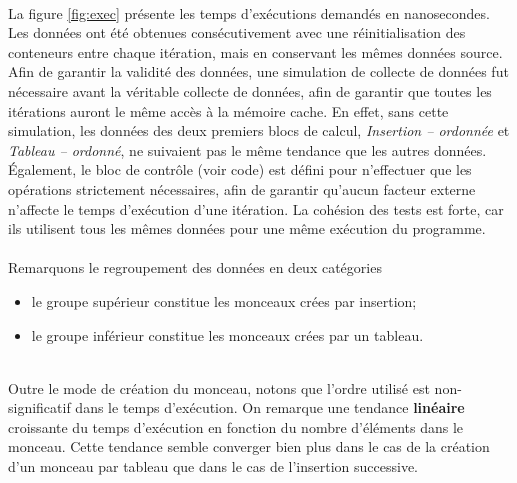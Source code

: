 \documentclass[12pt,letterpaper]{article}
\begin{document}
~\\
La figure \ref{fig:exec} présente les temps d'exécutions demandés en nanosecondes. Les données ont été obtenues consécutivement avec une réinitialisation des conteneurs 
entre chaque itération, mais en conservant les mêmes données source. Afin de garantir la validité des données, une simulation de collecte de données fut nécessaire avant la véritable collecte de données, 
afin de garantir que toutes les itérations auront le même accès à la mémoire cache. En effet, sans cette simulation, les données des deux premiers blocs de calcul, 
\textit{Insertion -- ordonnée} et \textit{Tableau -- ordonné}, ne suivaient pas le même tendance que les autres données. Également, le bloc de contrôle (voir code) 
est défini pour n'effectuer que les opérations strictement nécessaires, afin de garantir qu'aucun facteur externe n'affecte le temps d'exécution d'une itération. 
La cohésion des tests est forte, car ils utilisent tous les mêmes données pour une même exécution du programme. \\
\\
Remarquons le regroupement des données en deux catégories 
\begin{itemize}
\item le groupe supérieur constitue les monceaux crées par insertion;
\item le groupe inférieur constitue les monceaux crées par un tableau.
\end{itemize}
~\\
Outre le mode de création du monceau, notons que l'ordre utilisé est non-significatif dans le temps d'exécution. On remarque une tendance \textbf{linéaire} croissante du temps d'exécution en fonction du nombre d'éléments dans le monceau. Cette tendance semble converger bien plus dans le cas de la création d'un monceau par tableau que dans 
le cas de l'insertion successive.
\end{document}
